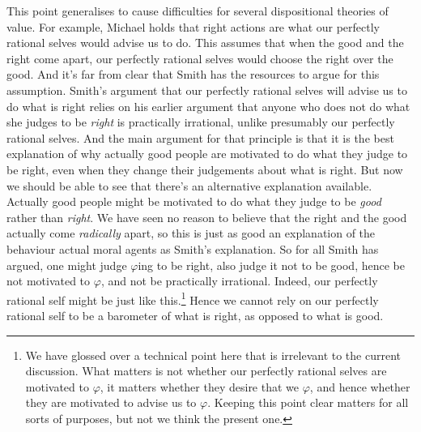 This point generalises to cause difficulties for several dispositional theories of value. For example, Michael \citet{Smith1994} holds that right actions are what our perfectly rational selves would advise us to do. This assumes that when the good and the right come apart, our perfectly rational selves would choose the right over the good. And it's far from clear that Smith has the resources to argue for this assumption. Smith's argument that our perfectly rational selves will advise us to do what is right relies on his earlier argument that anyone who does not do what she judges to be \textit{right} is practically irrational, unlike presumably our perfectly rational selves. And the main argument for that principle is that it is the best explanation of why actually good people are motivated to do what they judge to be right, even when they change their judgements about what is right. But now we should be able to see that there's an alternative explanation available. Actually good people might be motivated to do what they judge to be \textit{good} rather than \textit{right}. We have seen no reason to believe that the right and the good actually come \textit{radically} apart, so this is just as good an explanation of the behaviour actual moral agents as Smith's explanation. So for all Smith has argued, one might judge $\varphi $ing to be right, also judge it not to be good, hence be not motivated to $\varphi $, and not be practically irrational. Indeed, our perfectly rational self might be just like this.\footnote{We have glossed over a technical point here that is irrelevant to the current discussion. What matters is not whether our perfectly rational selves are motivated to $\varphi $, it matters whether they desire that we $\varphi $, and hence whether they are motivated to advise us to $\varphi $. Keeping this point clear matters for all sorts of purposes, but not we think the present one.} Hence we cannot rely on our perfectly rational self to be a barometer of what is right, as opposed to what is good.

%
%
%
%
%
%

